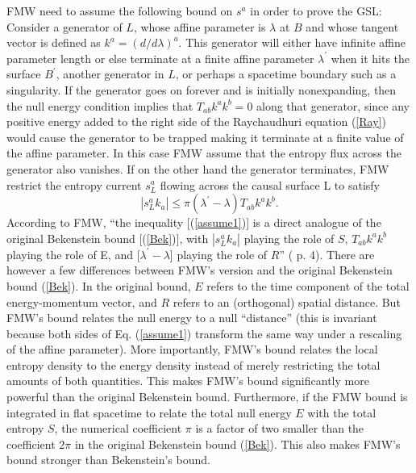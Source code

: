 \documentclass{article}
\begin{document}
FMW need to assume the following bound on $s^a$ in order to prove the GSL: Consider a generator of $L$, whose affine parameter is $\lambda$ at $B$ and whose tangent vector is defined as $k^{a} = (d/d\lambda)^{a}$.  This generator will either have infinite affine parameter length or else terminate at a finite affine parameter $\lambda^{\prime}$ when it hits the surface $B^{\prime}$, another generator in $L$, or perhaps a spacetime boundary such as a singularity.  If the generator goes on forever and is initially nonexpanding, then the null energy condition implies that $T_{ab}k^{a}k^{b} = 0$ along that generator, since any positive energy added to the right side of the Raychaudhuri equation (\ref{Ray}) would cause the generator to be trapped making it terminate at a finite value of the affine parameter.  In this case FMW assume that the entropy flux across the generator also vanishes.  If on the other hand the generator terminates, FMW restrict the entropy current $s^{a}_L$ flowing across the causal surface L to satisfy
\begin{equation}\label{assume1}
|s^{a}_{L}k_{a}| \le \pi(\lambda^{\prime} - \lambda)T_{ab}k^{a}k^{b}.
\end{equation}
According to FMW, ``the inequality [(\ref{assume1})] is a direct analogue of the original Bekenstein bound [(\ref{Bek})], with $|s^{a}_{L}k_{a}|$ playing the role of $S$, $T_{ab}k^{a}k^{b}$ playing the role of E, and [$\lambda^{\prime} - \lambda$] playing the role of $R$'' (\cite{FMW00} p. 4).  There are however a few differences between FMW's version and the original Bekenstein bound (\ref{Bek}).  In the original bound, $E$ refers to the time component of the total energy-momentum vector, and $R$ refers to an (orthogonal) spatial distance.  But FMW's bound relates the null energy to a null ``distance'' (this is invariant because both sides of Eq. (\ref{assume1}) transform the same way under a rescaling of the affine parameter).  More importantly, FMW's bound relates the local entropy density to the energy density instead of merely restricting the total amounts of both quantities.  This makes FMW's bound significantly more powerful than the original Bekenstein bound.  Furthermore, if the FMW bound is integrated in flat spacetime to relate the total null energy $E$ with the total entropy $S$, the numerical coefficient $\pi$ is a factor of two smaller than the coefficient $2\pi$ in the original Bekenstein bound (\ref{Bek}).  This also makes FMW's bound stronger than Bekenstein's bound.
\end{document}
